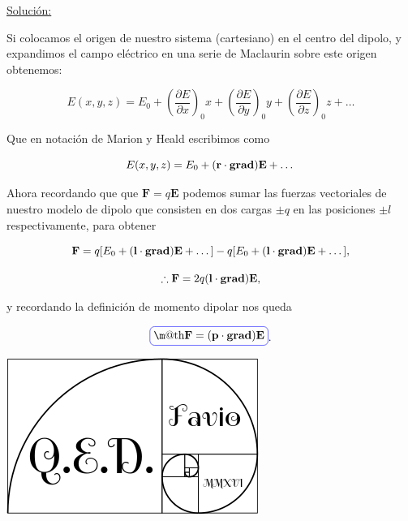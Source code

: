 \documentclass[a4paper,11pt]{article}
\makeatletter
\numberwithin{equation}{section}
\newcommand*{\boxcolor}{blue}
\renewcommand{\boxed}[1]{\textcolor{\boxcolor}{%
\tikz[baseline={([yshift=-1ex]current bounding box.center)}] \node [rectangle, minimum width=1ex,rounded corners,draw] {\normalcolor\m@th$\displaystyle#1$};}}
\makeatother
\begin{document}
\underline{Solución:} \vspace{.3cm}

Si colocamos el origen de nuestro sistema (cartesiano) en el centro del dipolo, y 
expandimos el campo eléctrico en una serie de Maclaurin sobre este origen obtenemos:

\begin{equation}
 E(x,y,z) = E_0 + \left(\frac{\partial E}{\partial x} \right)_0 x + 
  \left(\frac{\partial E}{\partial y} \right)_0 y + 
   \left(\frac{\partial E}{\partial z} \right)_0 z + \dots
\end{equation}

Que en notación de Marion y Heald \cite{marion2} escribimos como 

\begin{equation}
 E(x,y,z) = E_0 + (\mathbf{r}\cdot \text{\textbf{grad}})\mathbf{E} + \dots 
\end{equation}

Ahora recordando que que $\mathbf{F} = q\mathbf{E}$ podemos sumar las fuerzas 
vectoriales de nuestro modelo de dipolo que consisten en dos cargas $\pm q$ en 
las posiciones $\pm l$ respectivamente, para obtener 

\begin{equation}
 \mathbf{F} = q[E_0 + (\mathbf{l}\cdot \text{\textbf{grad}})\mathbf{E} + \dots ]
 - q[E_0 + (\mathbf{l}\cdot \text{\textbf{grad}})\mathbf{E} + \dots ],
\end{equation}

\begin{equation}
 \therefore \mathbf{F} = 2q (\mathbf{l}\cdot \text{\textbf{grad}})\mathbf{E},
\end{equation}

y recordando la definición de momento dipolar nos queda 

\begin{equation}
 \boxed{\mathbf{F} = (\mathbf{p}\cdot \text{\textbf{grad}})\mathbf{E}}.
\end{equation}

\hspace{10cm}\includegraphics[scale=0.25]{logoQED}
\end{document}
